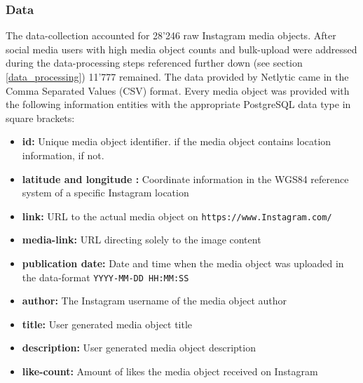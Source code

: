 \subsubsection*{Data} \label{Instagram_data}
The data-collection accounted for 28'246 raw Instagram media objects. After social media users with high media object counts and bulk-upload were addressed during the data-processing steps referenced further down (see section \ref{data_processing}) 11'777 remained.
The data provided by Netlytic came in the Comma Separated Values (CSV) format. Every media object was provided with the following information entities with the appropriate PostgreSQL data type in square brackets:
\begin{itemize}[label={}]
    \item \textbf{id:} Unique media object identifier.  if the media object contains location information,  if not.
    \item \textbf{latitude and longitude
    :} Coordinate information in the WGS84 reference system of a specific Instagram location 
    \item \textbf{link:} URL to the actual media object on \texttt{https://www.Instagram.com/} 
    \item \textbf{media-link:} URL directing solely to the image content 
    \item \textbf{publication date:} Date and time when the media object was uploaded in the data-format \texttt{YYYY-MM-DD HH:MM:SS} 
    \item \textbf{author:} The Instagram username of the media object author 
    \item \textbf{title:} User generated media object title 
    \item \textbf{description:} User generated media object description 
    \item \textbf{like-count:} Amount of likes the media object received on Instagram 
\end{itemize}

